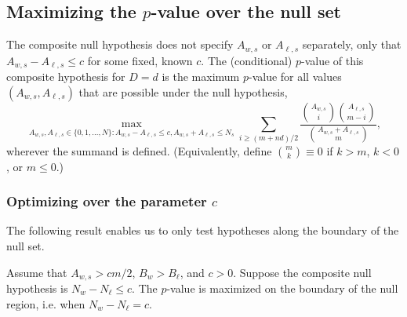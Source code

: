 \subsection{Maximizing the $p$-value over the null set}

The composite null hypothesis does not specify $A_{w,s}$ or $A_{\ell,s}$ separately, only 
that $A_{w,s} - A_{\ell,s} \le c$ for
some fixed, known $c$.
The (conditional) $p$-value of this composite hypothesis for $D=d$ is the maximum $p$-value for all
values $(A_{w,s}, A_{\ell,s})$ that are possible under the null hypothesis,
\begin{equation}
  \max_{A_{w,s}, A_{\ell,s} \in \{0, 1, \ldots, N \}: A_{w,s} - A_{\ell,s} \le c, A_{w,s} + A_{\ell,s} \le N_s}
   \sum_{i \geq (m+nd)/2} \frac{ {A_{w,s} \choose i}{A_{\ell,s} \choose m-i} }{{A_{w,s} + A_{\ell, s} \choose m}},
\end{equation}
wherever the summand is defined. 
(Equivalently, define ${m \choose k} \equiv 0$ if $k > m$, $k < 0$, or $m \le 0$.)

\subsubsection{Optimizing over the parameter $c$}
The following result enables us to only test hypotheses along the boundary of the null set.

\begin{theorem}
Assume that $A_{w,s} > cm/2$, $B_w > B_\ell$, and $c>0$.
Suppose the composite null hypothesis is $N_w - N_\ell \leq c$.
The $p$-value is maximized on the boundary of the null region, i.e. when $N_w - N_\ell = c$.
\end{theorem}


